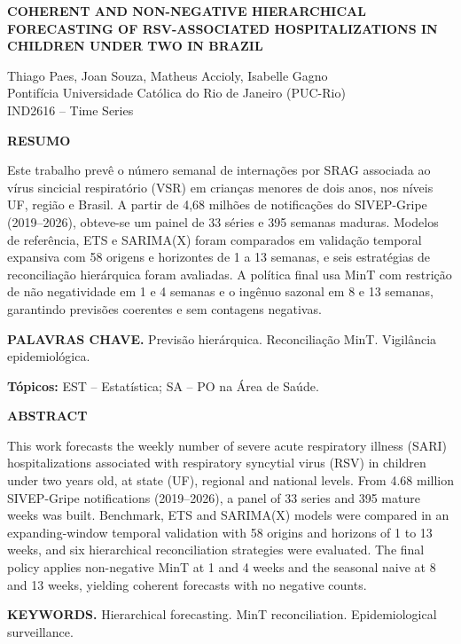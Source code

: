 \documentclass[12pt,a4paper]{article}
\begin{document}
\begin{center}
{\large\bfseries COHERENT AND NON-NEGATIVE HIERARCHICAL FORECASTING OF RSV-ASSOCIATED HOSPITALIZATIONS IN CHILDREN UNDER TWO IN BRAZIL}

\vspace{0.8cm}
Thiago Paes, Joan Souza, Matheus Accioly, Isabelle Gagno\\
Pontifícia Universidade Católica do Rio de Janeiro (PUC-Rio)\\
IND2616 -- Time Series
\end{center}

\vspace{0.5cm}
\noindent\textbf{RESUMO}

\noindent Este trabalho prevê o número semanal de internações por SRAG associada ao vírus sincicial respiratório (VSR) em crianças menores de dois anos, nos níveis UF, região e Brasil. A partir de 4,68 milhões de notificações do SIVEP-Gripe (2019--2026), obteve-se um painel de 33 séries e 395 semanas maduras. Modelos de referência, ETS e SARIMA(X) foram comparados em validação temporal expansiva com 58 origens e horizontes de 1 a 13 semanas, e seis estratégias de reconciliação hierárquica foram avaliadas. A política final usa MinT com restrição de não negatividade em 1 e 4 semanas e o ingênuo sazonal em 8 e 13 semanas, garantindo previsões coerentes e sem contagens negativas.

\noindent\textbf{PALAVRAS CHAVE.} Previsão hierárquica. Reconciliação MinT. Vigilância epidemiológica.

\noindent\textbf{Tópicos:} EST -- Estatística; SA -- PO na Área de Saúde.

\vspace{0.3cm}
\noindent\textbf{ABSTRACT}

\noindent This work forecasts the weekly number of severe acute respiratory illness (SARI) hospitalizations associated with respiratory syncytial virus (RSV) in children under two years old, at state (UF), regional and national levels. From 4.68 million SIVEP-Gripe notifications (2019--2026), a panel of 33 series and 395 mature weeks was built. Benchmark, ETS and SARIMA(X) models were compared in an expanding-window temporal validation with 58 origins and horizons of 1 to 13 weeks, and six hierarchical reconciliation strategies were evaluated. The final policy applies non-negative MinT at 1 and 4 weeks and the seasonal naive at 8 and 13 weeks, yielding coherent forecasts with no negative counts.

\noindent\textbf{KEYWORDS.} Hierarchical forecasting. MinT reconciliation. Epidemiological surveillance.
\end{document}

